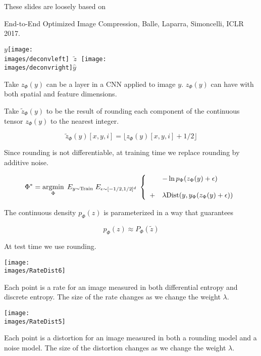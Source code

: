 {

These slides are loosely based on

\vfill
End-to-End Optimized Image Compression, Balle, Laparra, Simoncelli, ICLR 2017.


\vfill
\centerline{$y$\texttt{[image: \\images/deconvleft]} $\;\tilde{z}\;$ \texttt{[image: \\images/deconvright]}$\hat{y}$}



Take $z_\Phi(y)$ can be a layer in a CNN applied to image $y$.  $z_\Phi(y)$ can have with both spatial and feature dimensions.

\vfill
Take $\tilde{z}_\Phi(y)$ to be the result of rounding each component of the continuous tensor $z_\Phi(y)$ to the nearest integer.

\vfill
$$\tilde{z}_\Phi(y)[x,y,i] = \lfloor z_\Phi(y)[x,y,i] + 1/2 \rfloor$$


Since rounding is not differentiable, at training time we replace rounding by additive noise.

\vfill
{\huge \color{red} $$\Phi^* = \operatorname*{argmin}_\Phi\; E_{y \sim \mathrm{\mathrm{Train}}}\;E_{\epsilon \sim [-1/2,1/2]^d} \;\left\{\begin{array}{ll} &- \ln p_\Phi(z_\Phi(y) + \epsilon) \\
\\
+ & \lambda \mathrm{Dist}(y,y_\Phi(z_\Phi(y) + \epsilon)) \end{array}\right.$$}

The continuous density $p_\Phi(z)$ is parameterized in a way that guarantees

{\color{red} $$p_\Phi(z) \approx P_\Phi(\tilde{z})$$}

\vfill
At test time we use rounding.


\bigskip
\centerline{\texttt{[image: \\images/RateDist6]}}

Each point is a rate for an image measured in both differential entropy and discrete entropy.  The size of the rate changes as we change the weight $\lambda$.


\centerline{\texttt{[image: \\images/RateDist5]}}

Each point is a distortion for an image measured in both a rounding model and a noise model.  The size of the distortion changes as we change the weight $\lambda$.

}
